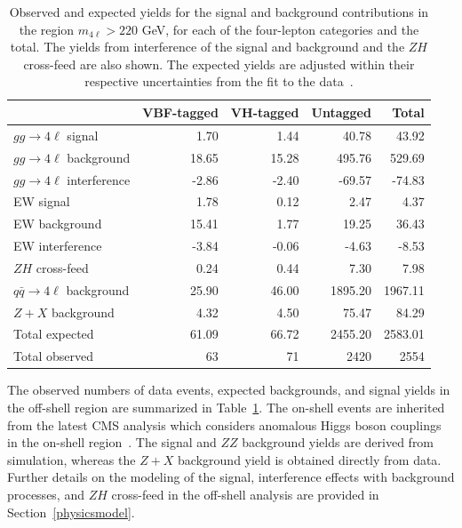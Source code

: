\begin{table}[!hbt] 
\centering
\begin{tabular}{lrrrr}
& VBF-tagged & VH-tagged & Untagged & Total \\
\hline
$gg\to4\ell$ signal &1.70 & 1.44 & 40.78 & 43.92 \\
$gg\to4\ell$ background & 18.65 & 15.28 & 495.76 & 529.69 \\
$gg\to4\ell$ interference & -2.86 & -2.40  &  -69.57 & -74.83 \\
EW signal         & 1.78 & 0.12 & 2.47& 4.37\\
EW background     & 15.41 & 1.77 & 19.25& 36.43\\
EW interference     & -3.84 & -0.06 & -4.63 & -8.53 \\
$ZH$ cross-feed & 0.24 & 0.44 & 7.30& 7.98 \\
$q\bar{q}\to4\ell$ background & 25.90 & 46.00 & 1895.20 & 1967.11  \\
$Z+X$ background & 4.32 & 4.50 & 75.47& 84.29  \\
\hline
Total expected & 61.09 & 66.72 & 2455.20 & 2583.01\\
Total observed & 63 & 71 & 2420 & 2554 \\
\end{tabular}
\caption{Observed and expected yields for the \Hboson signal and background contributions 
in the \offshell region $m_{4\ell}> 220$ GeV, for each of the four-lepton categories and the total. 
The yields from interference of the signal and background and the $ZH$ cross-feed are also shown. 
The expected yields are adjusted within their respective uncertainties from the fit to the data~\cite{PhysRevD.111.092014}.}
\label{tab:templateyields_offshell}
\end{table}

The observed numbers of data events, expected backgrounds, and signal yields in the off-shell region are summarized in Table~\ref{tab:templateyields_offshell}. The on-shell events are inherited from the latest CMS analysis which considers anomalous Higgs boson couplings in the on-shell region~\cite{CMS:2021nnc}. 
The signal and $ZZ$ background yields are derived from simulation, whereas the $Z+X$ background yield is obtained directly from data. Further details on the modeling of the \Hboson signal, interference effects with background processes, and $ZH$ cross-feed in the off-shell analysis are provided in Section~\ref{physicsmodel}.


